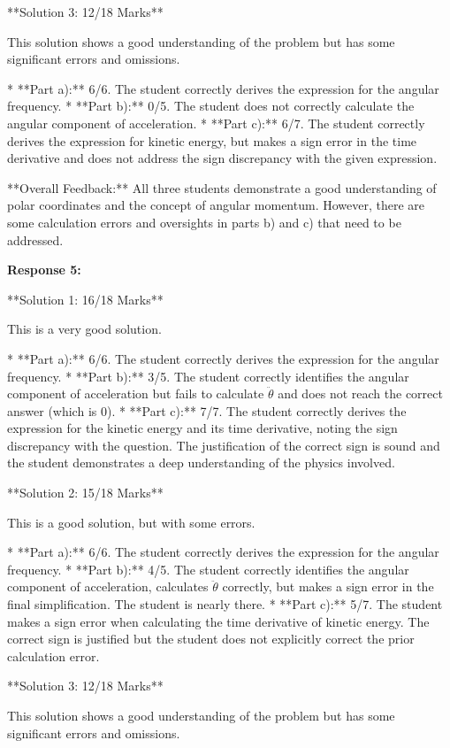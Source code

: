 \documentclass[a4paper,11pt]{article}
\begin{document}
**Solution 3: 12/18 Marks**

This solution shows a good understanding of the problem but has some significant errors and omissions.

*   **Part a):** 6/6. The student correctly derives the expression for the angular frequency.
*   **Part b):** 0/5. The student does not correctly calculate the angular component of acceleration.
*   **Part c):** 6/7. The student correctly derives the expression for kinetic energy, but makes a sign error in the time derivative and does not address the sign discrepancy with the given expression. 

**Overall Feedback:**
All three students demonstrate a good understanding of polar coordinates and the concept of angular momentum. However, there are some calculation errors and oversights in parts b) and c) that need to be addressed.

\textbf{Response 5:}

**Solution 1: 16/18 Marks**

This is a very good solution. 

*   **Part a):** 6/6. The student correctly derives the expression for the angular frequency.
*   **Part b):** 3/5. The student correctly identifies the angular component of acceleration but fails to calculate \(\ddot{\theta}\) and does not reach the correct answer (which is 0). 
*   **Part c):** 7/7. The student correctly derives the expression for the kinetic energy and its time derivative, noting the sign discrepancy with the question. The justification of the correct sign is sound and the student demonstrates a deep understanding of the physics involved. 

**Solution 2: 15/18 Marks**

This is a good solution, but with some errors.

*   **Part a):** 6/6. The student correctly derives the expression for the angular frequency.
*   **Part b):** 4/5. The student correctly identifies the angular component of acceleration, calculates \(\ddot{\theta}\) correctly, but makes a sign error in the final simplification. The student is nearly there. 
*   **Part c):** 5/7. The student makes a sign error when calculating the time derivative of kinetic energy. The correct sign is justified but the student does not explicitly correct the prior calculation error.

**Solution 3: 12/18 Marks**

This solution shows a good understanding of the problem but has some significant errors and omissions.
\end{document}
